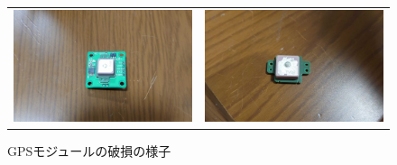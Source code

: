 \documentclass[a4paper,11pt,titlepage,uplatex]{jsarticle}
\begin{document}
\begin{itemize}
    \begin{figure}[H]
        \begin{tabular}{cc}
        \begin{minipage}[t]{0.45\hsize}
        \centering
        \includegraphics[width=0.8\linewidth]{pic_str/GPS_nodamage.jpg}
        \caption{GPSモジュール}\label{s_GPS_nodamage}
        \end{minipage}&
        \begin{minipage}[t]{0.45\hsize}
        \centering
        \includegraphics[width=0.8\linewidth]{pic_str/GPS_damage.jpg}
        \caption{GPSモジュールの破損の様子}\label{s_GPS_damage}
        \end{minipage}\end{tabular}
    \end{figure}
    
\end{itemize}
\end{document}
